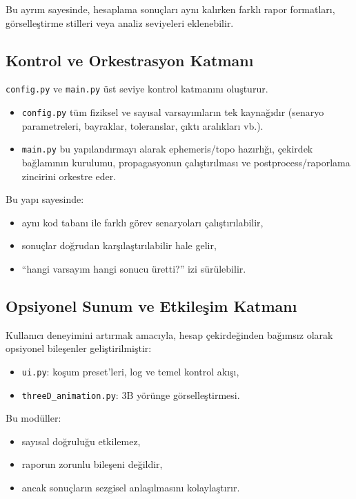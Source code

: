 Bu ayrım sayesinde, hesaplama sonuçları aynı kalırken farklı rapor formatları, görselleştirme stilleri veya analiz seviyeleri eklenebilir.

\subsection{Kontrol ve Orkestrasyon Katmanı}

\texttt{config.py} ve \texttt{main.py} üst seviye kontrol katmanını oluşturur.
\begin{itemize}
  \item \texttt{config.py} tüm fiziksel ve sayısal varsayımların tek kaynağıdır
  (senaryo parametreleri, bayraklar, toleranslar, çıktı aralıkları vb.).
  \item \texttt{main.py} bu yapılandırmayı alarak
  ephemeris/topo hazırlığı, çekirdek bağlamının kurulumu,
  propagasyonun çalıştırılması ve postprocess/raporlama zincirini orkestre eder.
\end{itemize}

Bu yapı sayesinde:
\begin{itemize}
  \item aynı kod tabanı ile farklı görev senaryoları çalıştırılabilir,
  \item sonuçlar doğrudan karşılaştırılabilir hale gelir,
  \item “hangi varsayım hangi sonucu üretti?” izi sürülebilir.
\end{itemize}

\subsection{Opsiyonel Sunum ve Etkileşim Katmanı}

Kullanıcı deneyimini artırmak amacıyla, hesap çekirdeğinden bağımsız olarak
opsiyonel bileşenler geliştirilmiştir:
\begin{itemize}
  \item \texttt{ui.py}: koşum preset’leri, log ve temel kontrol akışı,
  \item \texttt{threeD\_animation.py}: 3B yörünge görselleştirmesi.
\end{itemize}

Bu modüller:
\begin{itemize}
  \item sayısal doğruluğu etkilemez,
  \item raporun zorunlu bileşeni değildir,
  \item ancak sonuçların sezgisel anlaşılmasını kolaylaştırır.
\end{itemize}

